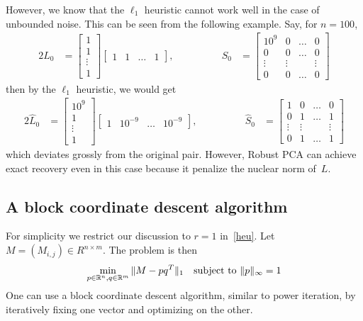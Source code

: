 However, we know that the $\ell_1$ heuristic cannot work well in the case of unbounded noise. This can be seen from the following example. Say, for $n=100$, 
\begin{alignat*}{2}
L_{0}&=\begin{bmatrix} 1\\ 1\\ \vdots \\ 1\end{bmatrix} \begin{bmatrix} 1 & 1 & \dots & 1 \end{bmatrix}, &\qquad \qquad
S_{0} &= \begin{bmatrix} 10^{9} & 0 & \dots & 0\\  0 & 0 & \dots & 0\\ \vdots & \vdots &  & \vdots\\ 0 & 0 & \dots & 0
\end{bmatrix}
\end{alignat*}
%
then by the $\ell_{1}$ heuristic, we would get 
\begin{alignat*}{2}
\hat{L}_{0}&=\begin{bmatrix} 10^9\\ 1\\ \vdots \\ 1\end{bmatrix} \begin{bmatrix} 1 & 10^{-9} & \dots & 10^{-9} \end{bmatrix}, &\qquad \qquad
\hat{S}_{0} &= \begin{bmatrix} 1 & 0 & \dots & 0\\  0 & 1 & \dots & 1\\ \vdots & \vdots &  & \vdots\\ 0 & 1 & \dots & 1
\end{bmatrix}
\end{alignat*}
%
which deviates grossly from the original pair. However, Robust PCA can achieve exact recovery even in this case because it penalize the nuclear norm of~$L$.



\subsection{A block coordinate descent algorithm}

For simplicity we restrict our discussion to $r=1$ in~\eqref{heu}. Let $M=(M_{i,j})\in R^{n \times m}$. The problem is then
%
\[
\begin{aligned}
\min_{p \in {\mathbb R}^n, q \in {\mathbb R}^m} \|M - pq^T\|_1 &&\text{subject to } \|p\|_\infty = 1
\end{aligned}
\]
One can use a block coordinate descent algorithm, similar to power iteration, by iteratively fixing one vector and optimizing on the other. 

